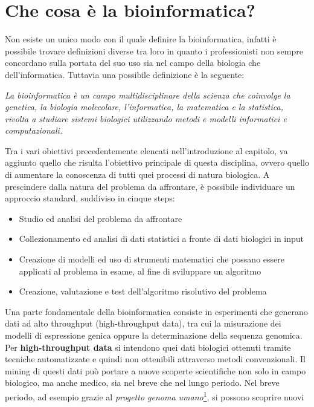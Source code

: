 \section{Che cosa \`e la bioinformatica?}
Non esiste un unico modo con il quale definire la bioinformatica, infatti è possibile trovare definizioni diverse tra loro in quanto i professionisti non sempre concordano sulla portata del suo uso sia nel campo della biologia che dell'informatica. Tuttavia una possibile definizione è la seguente:
\begin{center}
\textit{La bioinformatica è un campo multidisciplinare della scienza che coinvolge la genetica, la biologia molecolare, l'informatica, la matematica e la statistica, rivolta a studiare sistemi biologici utilizzando metodi e modelli informatici e computazionali.}
\end{center}
Tra i vari obiettivi precedentemente elencati nell'introduzione al capitolo, va aggiunto quello che risulta l'obiettivo principale di questa disciplina, ovvero quello di aumentare la conoscenza di tutti quei processi di natura biologica.
\newline
A prescindere dalla natura del problema da affrontare, è possibile individuare un approccio standard, suddiviso in cinque steps:
\begin{itemize}
	\item Studio ed analisi del problema da affrontare
	\item Collezionamento ed analisi di dati statistici a fronte di dati biologici in input 
	\item Creazione di modelli ed uso di strumenti matematici che possano essere applicati al problema in esame, al fine di sviluppare un algoritmo
	\item Creazione, valutazione e test dell'algoritmo risolutivo del problema
\end{itemize}
Una parte fondamentale della bioinformatica consiste in esperimenti che generano dati ad alto throughput (high-throughput data), tra cui la misurazione dei modelli di espressione genica oppure la determinazione della sequenza genomica. Per \textbf{high-throughput data} si intendono quei dati biologici ottenuti tramite tecniche automatizzate e quindi non ottenibili attraverso metodi convenzionali.
Il mining di questi dati può portare a nuove scoperte scientifiche non solo in campo biologico, ma anche medico, sia nel breve che nel lungo periodo.
\newline
Nel breve periodo, ad esempio grazie al \textit{progetto genoma umano}\footnote{Il progetto genoma umano (Human Genome Project) è stato uno dei più grandi progetti scientifici degli ultimi anni. L'obiettivo era quello di ottenere la sequenza del genoma umano (e quindi il suo intero DNA) e identificare in esso i geni contenuti. Il progetto è cominciato nel 1990, per poi essere completato nel 2003 ed ulteriori ricerche sono ancora in corso.}, si possono scoprire nuovi geni legati alle malattie e nuovi bersagli molecolari, ovvero quei processi biologici, intesi come proteine, recettori, pathway biochimici etc su cui si può intervenire per modificare il decorso di una malattia.
